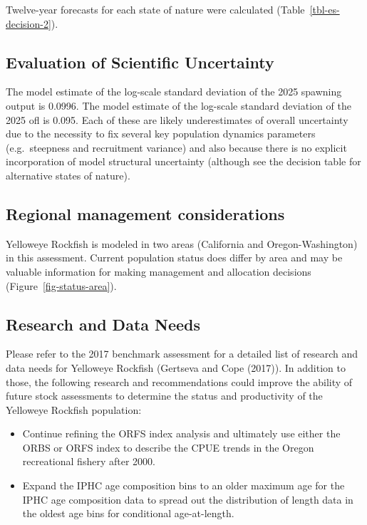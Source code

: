 \documentclass[
]{scrartcl}
\providecommand{\tightlist}{%
  \setlength{\itemsep}{0pt}\setlength{\parskip}{0pt}}\usepackage{longtable,booktabs,array}
\begin{document}
Twelve-year forecasts for each state of nature were calculated
(Table~\ref{tbl-es-decision-2}).

\subsection{Evaluation of Scientific
Uncertainty}\label{evaluation-of-scientific-uncertainty}

The model estimate of the log-scale standard deviation of the 2025
spawning output is 0.0996. The model estimate of the log-scale standard
deviation of the 2025 \gls{ofl} is 0.095. Each of these are likely
underestimates of overall uncertainty due to the necessity to fix
several key population dynamics parameters (e.g.~steepness and
recruitment variance) and also because there is no explicit
incorporation of model structural uncertainty (although see the decision
table for alternative states of nature).

\subsection{Regional management
considerations}\label{regional-management-considerations}

Yelloweye Rockfish is modeled in two areas (California and
Oregon-Washington) in this assessment. Current population status does
differ by area and may be valuable information for making management and
allocation decisions (Figure~\ref{fig-status-area}).

\subsection{Research and Data Needs}\label{research-and-data-needs-1}

Please refer to the 2017 benchmark assessment for a detailed list of
research and data needs for Yelloweye Rockfish (Gertseva and Cope
(2017)). In addition to those, the following research and
recommendations could improve the ability of future stock assessments to
determine the status and productivity of the Yelloweye Rockfish
population:

\begin{itemize}
\tightlist
\item
  Continue refining the ORFS index analysis and ultimately use either
  the ORBS or ORFS index to describe the CPUE trends in the Oregon
  recreational fishery after 2000.
\item
  Expand the IPHC age composition bins to an older maximum age for the
  IPHC age composition data to spread out the distribution of length
  data in the oldest age bins for conditional age-at-length.
\end{itemize}
\end{document}
